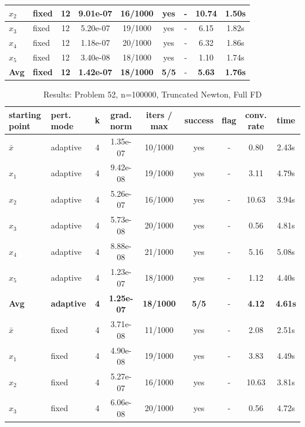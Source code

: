 \begin{longtable}{|l|l|c|c|c|c|c|c|c|}
\hline
$x_2$ & fixed & 12 & 9.01e-07 & 16/1000 & yes & - & 10.74 & 1.50s \\
\hline
$x_3$ & fixed & 12 & 5.20e-07 & 19/1000 & yes & - & 6.15 & 1.82s \\
\hline
$x_4$ & fixed & 12 & 1.18e-07 & 20/1000 & yes & - & 6.32 & 1.86s \\
\hline
$x_5$ & fixed & 12 & 3.40e-08 & 18/1000 & yes & - & 1.10 & 1.74s \\
\hline
\hline\hline
\textbf{Avg} & \textbf{fixed} & \textbf{12} & \textbf{1.42e-07} & \textbf{18/1000} & \textbf{5/5} & - & \textbf{5.63} & \textbf{1.76s} \\
\hline\hline
\end{longtable}


\begin{longtable}{|l|l|c|c|c|c|c|c|c|}
\caption{Results: Problem 52, n=100000, Truncated Newton, Full FD} \\
\hline
\textbf{starting point} & \textbf{pert. mode} & \textbf{k} & \textbf{grad. norm} & \textbf{iters / max} & \textbf{success} & \textbf{flag} & \textbf{conv. rate} & \textbf{time} \\
\hline
\endfirsthead
\endhead
\endfoot
\hline
\endlastfoot
$\bar{x}$ & adaptive & 4 & 1.35e-07 & 10/1000 & yes & - & 0.80 & 2.43s \\
\hline
$x_1$ & adaptive & 4 & 9.42e-08 & 19/1000 & yes & - & 3.11 & 4.79s \\
\hline
$x_2$ & adaptive & 4 & 5.26e-07 & 16/1000 & yes & - & 10.63 & 3.94s \\
\hline
$x_3$ & adaptive & 4 & 5.73e-08 & 20/1000 & yes & - & 0.56 & 4.81s \\
\hline
$x_4$ & adaptive & 4 & 8.88e-08 & 21/1000 & yes & - & 5.16 & 5.08s \\
\hline
$x_5$ & adaptive & 4 & 1.23e-07 & 18/1000 & yes & - & 1.12 & 4.40s \\
\hline
\hline\hline
\textbf{Avg} & \textbf{adaptive} & \textbf{4} & \textbf{1.25e-07} & \textbf{18/1000} & \textbf{5/5} & - & \textbf{4.12} & \textbf{4.61s} \\
\hline\hline
\hline
$\bar{x}$ & fixed & 4 & 3.71e-08 & 11/1000 & yes & - & 2.08 & 2.51s \\
\hline
$x_1$ & fixed & 4 & 4.90e-08 & 19/1000 & yes & - & 3.83 & 4.49s \\
\hline
$x_2$ & fixed & 4 & 5.27e-07 & 16/1000 & yes & - & 10.63 & 3.81s \\
\hline
$x_3$ & fixed & 4 & 6.06e-08 & 20/1000 & yes & - & 0.56 & 4.72s \\

\end{longtable}
